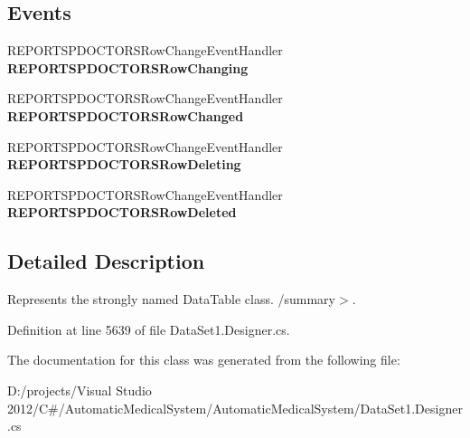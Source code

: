 \subsection*{Events}
\begin{CompactItemize}
\item 
REPORTSPDOCTORSRowChangeEventHandler \textbf{REPORTSPDOCTORSRowChanging}\label{class_automatic_medical_system_1_1_data_set1_1_1_r_e_p_o_r_t_s_p_d_o_c_t_o_r_s_data_table_58f39859fb57eac2262e3b49b162038a}

\item 
REPORTSPDOCTORSRowChangeEventHandler \textbf{REPORTSPDOCTORSRowChanged}\label{class_automatic_medical_system_1_1_data_set1_1_1_r_e_p_o_r_t_s_p_d_o_c_t_o_r_s_data_table_0151a147a0f0a7b0ddb194fd49b14050}

\item 
REPORTSPDOCTORSRowChangeEventHandler \textbf{REPORTSPDOCTORSRowDeleting}\label{class_automatic_medical_system_1_1_data_set1_1_1_r_e_p_o_r_t_s_p_d_o_c_t_o_r_s_data_table_f6d627d59b38172b91329a88f196b83e}

\item 
REPORTSPDOCTORSRowChangeEventHandler \textbf{REPORTSPDOCTORSRowDeleted}\label{class_automatic_medical_system_1_1_data_set1_1_1_r_e_p_o_r_t_s_p_d_o_c_t_o_r_s_data_table_2c0ef4ad0680626ce65e3bc412e1a745}

\end{CompactItemize}


\subsection{Detailed Description}
Represents the strongly named DataTable class. /summary$>$. 

Definition at line 5639 of file DataSet1.Designer.cs.

The documentation for this class was generated from the following file:\begin{CompactItemize}
\item 
D:/projects/Visual Studio 2012/C\#/AutomaticMedicalSystem/AutomaticMedicalSystem/DataSet1.Designer.cs\end{CompactItemize}
